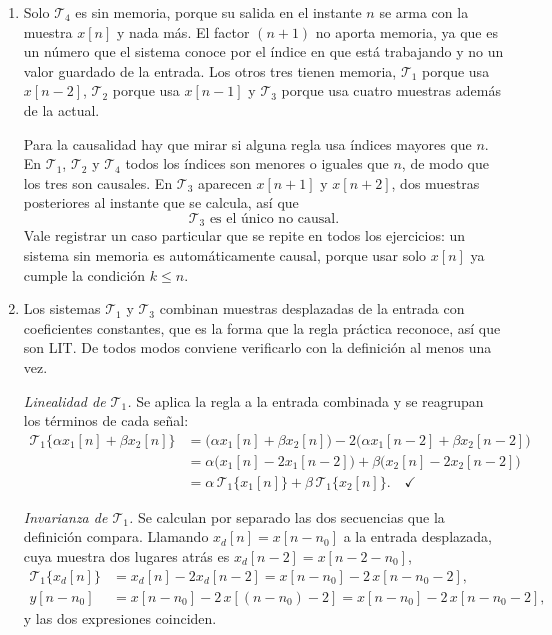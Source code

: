 \documentclass[10pt,a4paper]{article}
\begin{document}
	\begin{enumerate}
		\item Solo $\mathcal{T}_4$ es sin memoria, porque su
		salida en el instante $n$ se arma con la muestra $x[n]$ y nada más. El factor
		$(n+1)$ no aporta memoria, ya que es un número que el sistema conoce por el índice
		en que está trabajando y no un valor guardado de la entrada. Los otros tres tienen
		memoria, $\mathcal{T}_1$ porque usa $x[n-2]$, $\mathcal{T}_2$ porque usa $x[n-1]$ y
		$\mathcal{T}_3$ porque usa cuatro muestras además de la actual.

		Para la causalidad hay que mirar si alguna regla usa índices mayores que $n$.
		En $\mathcal{T}_1$, $\mathcal{T}_2$ y $\mathcal{T}_4$ todos los índices son menores
		o iguales que $n$, de modo que los tres son causales. En $\mathcal{T}_3$ aparecen
		$x[n+1]$ y $x[n+2]$, dos muestras posteriores al instante que se calcula, así que
		\[
			\boxed{\;\mathcal{T}_3 \text{ es el único no causal.}\;}
		\]
		Vale registrar un caso particular que se repite en todos los ejercicios: un sistema
		sin memoria es automáticamente causal, porque usar solo $x[n]$ ya cumple la
		condición $k\le n$.

		\item Los sistemas $\mathcal{T}_1$ y
		$\mathcal{T}_3$ combinan muestras desplazadas de la entrada con coeficientes
		constantes, que es la forma que la regla práctica reconoce, así que son LIT. De
		todos modos conviene verificarlo con la definición al menos una vez.

		\emph{Linealidad de $\mathcal{T}_1$.} Se aplica la regla a la entrada combinada y se
		reagrupan los términos de cada señal:
		\[
			\begin{aligned}
			\mathcal{T}_1\{\alpha x_1[n]+\beta x_2[n]\}
			&= \bigl(\alpha x_1[n]+\beta x_2[n]\bigr) - 2\bigl(\alpha x_1[n-2]+\beta x_2[n-2]\bigr) \\
			&= \alpha\bigl(x_1[n]-2x_1[n-2]\bigr) + \beta\bigl(x_2[n]-2x_2[n-2]\bigr) \\
			&= \alpha\,\mathcal{T}_1\{x_1[n]\} + \beta\,\mathcal{T}_1\{x_2[n]\}. \quad\checkmark
			\end{aligned}
		\]

		\emph{Invarianza de $\mathcal{T}_1$.} Se calculan por separado las dos secuencias que
		la definición compara. Llamando $x_d[n]=x[n-n_0]$ a la entrada desplazada, cuya
		muestra dos lugares atrás es $x_d[n-2]=x[n-2-n_0]$,
		\[
			\begin{aligned}
			\mathcal{T}_1\{x_d[n]\} &= x_d[n]-2x_d[n-2] = x[n-n_0]-2\,x[n-n_0-2], \\
			y[n-n_0] &= x[n-n_0]-2\,x[(n-n_0)-2] = x[n-n_0]-2\,x[n-n_0-2],
			\end{aligned}
		\]
		y las dos expresiones coinciden.


\end{enumerate}
\end{document}
